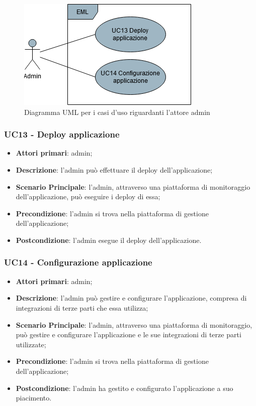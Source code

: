 \begin{figure}[H]
\centering
\includegraphics[scale=0.6]{res/UseCase/Immagini/Admin}
\caption{Diagramma UML per i casi d'uso riguardanti l'attore admin}
\end{figure}

\subsubsection{UC13 - Deploy applicazione}
\begin{itemize}
\item \textbf{Attori primari}: admin;
\item \textbf{Descrizione}: l'admin può effettuare il deploy dell'applicazione;
\item \textbf{Scenario Principale}: l'admin, attraverso una piattaforma di monitoraggio dell'applicazione, può eseguire i deploy di essa;
\item \textbf{Precondizione}: l'admin si trova nella piattaforma di gestione dell'applicazione;
\item \textbf{Postcondizione}: l'admin esegue il deploy dell'applicazione.
\end{itemize}

\subsubsection{UC14 - Configurazione applicazione}
\begin{itemize}
\item \textbf{Attori primari}: admin;
\item \textbf{Descrizione}: l'admin può gestire e configurare l'applicazione, compresa di integrazioni di terze parti che essa utilizza;
\item \textbf{Scenario Principale}: l'admin, attraverso una piattaforma di monitoraggio, può gestire e configurare l'applicazione e le sue integrazioni di terze parti utilizzate;
\item \textbf{Precondizione}: l'admin si trova nella piattaforma di gestione dell'applicazione;
\item \textbf{Postcondizione}: l'admin ha gestito e configurato l'applicazione a suo piacimento.
\end{itemize}

